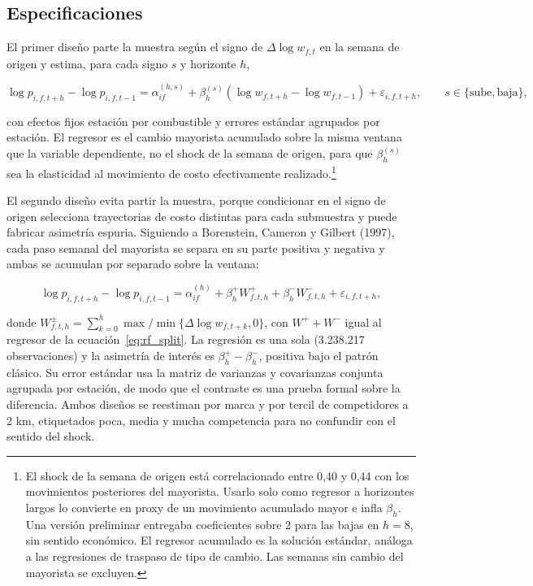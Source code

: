\documentclass[11pt]{article}
\begin{document}
\subsection{Especificaciones}
\label{sec:asimetrias_especificacion}

El primer diseño parte la muestra según el signo de $\Delta \log w_{f,t}$ en
la semana de origen y estima, para cada signo $s$ y horizonte $h$,

\begin{equation}
\label{eq:rf_split}
\log p_{i,f,t+h} - \log p_{i,f,t-1}
= \alpha_{if}^{(h,s)}
+ \beta_h^{(s)} \left( \log w_{f,t+h} - \log w_{f,t-1} \right)
+ \varepsilon_{i,f,t+h},
\qquad s \in \{\text{sube}, \text{baja}\},
\end{equation}

con efectos fijos estación por combustible y errores estándar agrupados por
estación. El regresor es el cambio mayorista acumulado sobre la misma
ventana que la variable dependiente, no el shock de la semana de origen,
para que $\beta_h^{(s)}$ sea la elasticidad al movimiento de costo
efectivamente realizado.\footnote{El shock de la semana de origen está
correlacionado entre 0,40 y 0,44 con los movimientos posteriores del
mayorista. Usarlo solo como regresor a horizontes largos lo convierte en
proxy de un movimiento acumulado mayor e infla $\beta_h$. Una versión
preliminar entregaba coeficientes sobre 2 para las bajas en $h = 8$, sin
sentido económico. El regresor acumulado es la solución estándar, análoga a
las regresiones de traspaso de tipo de cambio. Las semanas sin cambio del
mayorista se excluyen.}

El segundo diseño evita partir la muestra, porque condicionar en el signo de
origen selecciona trayectorias de costo distintas para cada submuestra y
puede fabricar asimetría espuria. Siguiendo a Borenstein, Cameron y Gilbert
(1997), cada paso semanal del mayorista se separa en su parte positiva y
negativa y ambas se acumulan por separado sobre la ventana:

\begin{equation}
\label{eq:rf_decomp}
\log p_{i,f,t+h} - \log p_{i,f,t-1}
= \alpha_{if}^{(h)}
+ \beta_h^{+} W^{+}_{f,t,h}
+ \beta_h^{-} W^{-}_{f,t,h}
+ \varepsilon_{i,f,t+h},
\end{equation}

donde $W^{\pm}_{f,t,h} = \sum_{k=0}^{h} \max/\min\{\Delta \log w_{f,t+k},
0\}$, con $W^{+} + W^{-}$ igual al regresor de la
ecuación~\eqref{eq:rf_split}. La regresión es una sola (3.238.217
observaciones) y la asimetría de interés es $\beta_h^{+} - \beta_h^{-}$,
positiva bajo el patrón clásico. Su error estándar usa la matriz de
varianzas y covarianzas conjunta agrupada por estación, de modo que el
contraste es una prueba formal sobre la diferencia. Ambos diseños se
reestiman por marca y por tercil de competidores a 2 km, etiquetados poca,
media y mucha competencia para no confundir con el sentido del shock.
\end{document}
